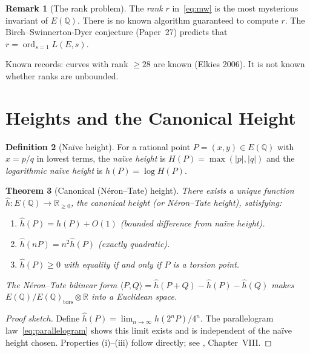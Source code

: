 \documentclass[12pt,a4paper]{amsart}
\newtheorem{theorem}{Theorem}[section]
\theoremstyle{definition}
\newtheorem{definition}[theorem]{Definition}
\newtheorem{remark}[theorem]{Remark}
\newcommand{\Q}{\mathbb{Q}}
\newcommand{\R}{\mathbb{R}}
\DeclareMathOperator{\ord}{ord}
\begin{document}
\begin{remark}[The rank problem]
The \emph{rank} $r$ in~\eqref{eq:mw} is the most mysterious invariant
of $E(\Q)$.  There is no known algorithm guaranteed to compute $r$.
The Birch--Swinnerton-Dyer conjecture (Paper~27) predicts that
$r = \ord_{s=1} L(E,s)$.

Known records: curves with rank $\ge 28$ are known (Elkies 2006).
It is not known whether ranks are unbounded.
\end{remark}

\section{Heights and the Canonical Height}

\begin{definition}[Na\"ive height]
\label{def:naive_height}
For a rational point $P = (x, y) \in E(\Q)$ with $x = p/q$ in lowest terms,
the \emph{na\"ive height} is $H(P) = \max(|p|, |q|)$ and
the \emph{logarithmic na\"ive height} is $h(P) = \log H(P)$.
\end{definition}

\begin{theorem}[Canonical (N\'eron--Tate) height]
\label{thm:neron_tate}
There exists a unique function $\hat h: E(\Q) \to \R_{\ge 0}$, the
\emph{canonical height} (or N\'eron--Tate height), satisfying:
\begin{enumerate}
  \item[\textup{(i)}] $\hat h(P) = h(P) + O(1)$ (bounded difference from na\"ive height).
  \item[\textup{(ii)}] $\hat h(nP) = n^2 \hat h(P)$ (exactly quadratic).
  \item[\textup{(iii)}] $\hat h(P) \ge 0$ with equality if and only if $P$
    is a torsion point.
\end{enumerate}
The \emph{N\'eron--Tate bilinear form}
$\langle P, Q \rangle = \hat h(P+Q) - \hat h(P) - \hat h(Q)$
makes $E(\Q)/E(\Q)_{\mathrm{tors}} \otimes \R$ into a Euclidean space.
\end{theorem}

\begin{proof}[Proof sketch]
Define $\hat h(P) = \lim_{n\to\infty} h(2^n P)/4^n$.
The parallelogram law~\eqref{eq:parallelogram} shows this limit exists
and is independent of the na\"ive height chosen.
Properties (i)--(iii) follow directly; see \cite{Silverman1986}, Chapter~VIII.
\end{proof}
\end{document}
